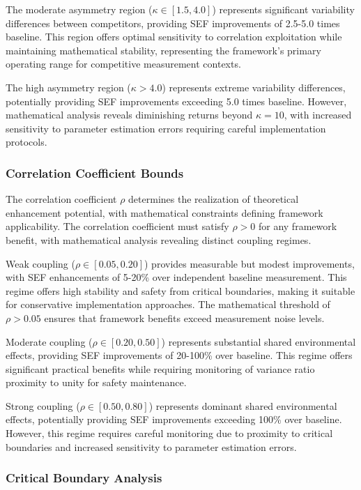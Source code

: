 The moderate asymmetry region ($\kappa \in [1.5, 4.0]$) represents significant variability differences between competitors, providing SEF improvements of 2.5-5.0 times baseline. This region offers optimal sensitivity to correlation exploitation while maintaining mathematical stability, representing the framework's primary operating range for competitive measurement contexts.

The high asymmetry region ($\kappa > 4.0$) represents extreme variability differences, potentially providing SEF improvements exceeding 5.0 times baseline. However, mathematical analysis reveals diminishing returns beyond $\kappa = 10$, with increased sensitivity to parameter estimation errors requiring careful implementation protocols.

\subsubsection{Correlation Coefficient Bounds}

The correlation coefficient $\rho$ determines the realization of theoretical enhancement potential, with mathematical constraints defining framework applicability. The correlation coefficient must satisfy $\rho > 0$ for any framework benefit, with mathematical analysis revealing distinct coupling regimes.

Weak coupling ($\rho \in [0.05, 0.20]$) provides measurable but modest improvements, with SEF enhancements of 5-20\% over independent baseline measurement. This regime offers high stability and safety from critical boundaries, making it suitable for conservative implementation approaches. The mathematical threshold of $\rho > 0.05$ ensures that framework benefits exceed measurement noise levels.

Moderate coupling ($\rho \in [0.20, 0.50]$) represents substantial shared environmental effects, providing SEF improvements of 20-100\% over baseline. This regime offers significant practical benefits while requiring monitoring of variance ratio proximity to unity for safety maintenance.

Strong coupling ($\rho \in [0.50, 0.80]$) represents dominant shared environmental effects, potentially providing SEF improvements exceeding 100\% over baseline. However, this regime requires careful monitoring due to proximity to critical boundaries and increased sensitivity to parameter estimation errors.

\subsubsection{Critical Boundary Analysis}

